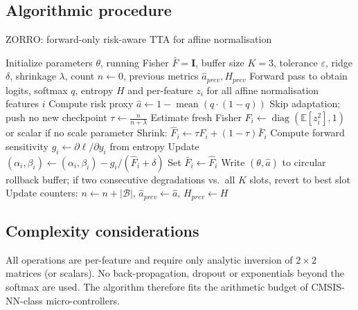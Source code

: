 \documentclass{article} %
\begin{document}
\subsection{Algorithmic procedure}
\begin{algorithm}
\caption{ZORRO: forward-only risk-aware TTA for affine normalisation\@}
\begin{algorithmic}[1]
\State Initialize parameters \(\theta\), running Fisher \(\bar{F}=\mathbf{I}\), buffer size \(K=3\), tolerance \(\varepsilon\), ridge \(\delta\), shrinkage \(\lambda\), count \(n\leftarrow 0\), previous metrics \(\hat{a}_{prev}, H_{prev}\)%
%
  \State Forward pass to obtain logits, softmax \(q\), entropy \(H\) and per-feature \(z_i\) for all affine normalisation features \(i\)%
  \State Compute risk proxy \(\hat{a} \leftarrow 1 - \operatorname{mean}(q\cdot(1-q))\)%
     \State Skip adaptation; push no new checkpoint%
  \Else%
     \State \(\tau \leftarrow \frac{n}{n+\lambda}\)%
        \State Estimate fresh Fisher \(F_{i} \leftarrow \operatorname{diag}(\mathbb{E}[z_i^2], 1)\) or scalar if no scale parameter%
        \State Shrink: \(\hat{F}_{i} \leftarrow \tau F_{i} + (1-\tau)\bar{F}_{i}\)%
        \State Compute forward sensitivity \(g_i \leftarrow \partial \ell/\partial y_i\) from entropy%
        \State Update \((\alpha_i,\beta_i) \leftarrow (\alpha_i,\beta_i) - g_i/(\hat{F}_{i}+\delta)\)%
        \State Set \(\bar{F}_{i} \leftarrow \hat{F}_{i}\)%
     \EndFor%
     \State Write \((\theta, \hat{a})\) to circular rollback buffer; if two consecutive degradations vs.\ all \(K\) slots, revert to best slot%
  \EndIf%
  \State Update counters: \(n \leftarrow n + |\mathcal{B}|\), \(\hat{a}_{prev}\leftarrow \hat{a}\), \(H_{prev}\leftarrow H\)%
\EndFor%
\end{algorithmic}
\end{algorithm}
\subsection{Complexity considerations}
All operations are per-feature and require only analytic inversion of \(2\times2\) matrices (or scalars). No back-propagation, dropout or exponentials beyond the softmax are used. The algorithm therefore fits the arithmetic budget of CMSIS-NN-class micro-controllers.
\end{document}
